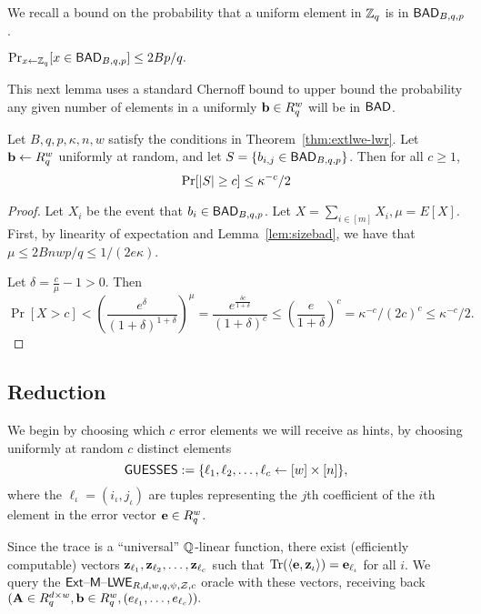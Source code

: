 We recall a bound on the probability that a uniform element in $\mathbb{Z}_q$ is in
$\textsf{BAD}_{B,q,p}$.
\begin{lemma}{\cite[Lemma~2.7]{DBLP:conf/crypto/AlwenKPW13}}
\label{lem:sizebad} $\Pr_{x \gets \mathbb{Z}_q}[x \in \textsf{BAD}_{B,q,p}] \leq 2Bp/q.$
\end{lemma}

This next lemma uses a standard Chernoff bound to upper bound the
probability any given number of elements in a uniformly $\mathbf{b} \in
R_q^{w}$ will be in $\textsf{BAD}$.

\begin{lemma}
\label{lem:badbound}
Let $B,q,p,\kappa,n,w$ satisfy the conditions in
Theorem~\ref{thm:extlwe-lwr}.  Let $\mathbf{b} \gets R_q^{w}$ uniformly at
random, and let $S = \{b_{i,j} \in \textsf{BAD}_{B,q,p}\}$.  Then for all
$c \geq 1$,
\[\Pr[\lvert S\rvert \geq c] \leq \kappa^{-c}/2\]
\end{lemma}
\begin{proof}
  Let $X_i$ be the event that $b_i \in \textsf{BAD}_{B,q,p}$.  Let $X =
  \sum_{i \in [m]}X_i, \mu = E[X]$. First, by linearity of expectation
  and Lemma~\ref{lem:sizebad}, we have that $\mu \leq 2Bnwp/q \leq
  1/(2e\kappa)$.

Let $\delta = \tfrac{c}{\mu}-1 > 0$. Then
\[\Pr[X > c] <
\left(\frac{e^{\delta}}{(1+\delta)^{1+\delta}}\right)^{\mu}
= \frac{e^{\tfrac{\delta c}{1+\delta}}}{(1+\delta)^{c}} \leq
\left(\frac{e}{1+\delta}\right)^c = \kappa^{-c}/(2c)^{c} \leq \kappa^{-c}/2.\]
\end{proof}
\subsection{Reduction}
\label{sec:reduction}

We begin by choosing which $c$ error elements we will receive as
hints, by choosing uniformly at random $c$ distinct
elements 
\[\textsf{GUESSES} := \{\ell_1, \ell_2, \ldots, \ell_c \gets [w] \times [n]\},\]
where the $\ell_{\iota}=(i_{\iota},j_{\iota})$ are tuples representing
the $j$th coefficient of the $i$th element in the error vector $\mathbf{e}
\in R_q^{w}$.

Since the trace is a ``universal'' $\mathbb{Q}$-linear function, there exist
(efficiently computable) vectors $\mathbf{z}_{\ell_1}, \mathbf{z}_{\ell_2},
\ldots, \mathbf{z}_{\ell_c}$ such that
$\operatorname{Tr}(\langle\mathbf{e},\mathbf{z}_{\iota}\rangle)=\mathbf{e}_{\ell_{\iota}}$ for all $i$.
We query the $\mathsf{Ext \text{\textendash} M \text{\textendash} LWE}_{R,d,w,q,\psi,\mathcal{Z},c}$ oracle with these
vectors, receiving back $(\mathbf{A} \in R_q^{d \times w}, \mathbf{b} \in
R_q^w,(e_{\ell_1}, \ldots, e_{\ell_c})).$

